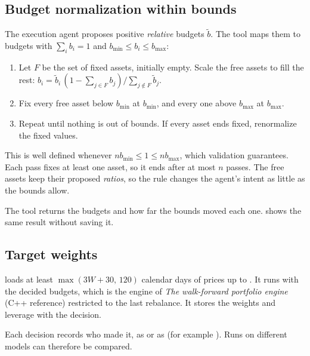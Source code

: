 \documentclass[11pt,a4paper]{article}
\makeatletter
\newcommand{\snippetsource}[1]{\csname snippet@#1\endcsname}
\newcommand{\snippet}[3]{%
  }
\newcommand{\xref}[2]{\emph{#2} (#1 reference)}
\makeatother
\begin{document}
\subsection{Budget normalization within bounds}
The execution agent proposes positive \emph{relative} budgets $\tilde b$. The tool
 maps them to budgets with $\sum_ib_i=1$ and
$b_{\min}\le b_i\le b_{\max}$:
\begin{enumerate}
  \item Let $F$ be the set of fixed assets, initially empty. Scale the free assets to fill
        the rest: $b_i=\tilde b_i\,(1-\sum_{j\in F}b_j)/\sum_{j\notin F}\tilde b_j$.
  \item Fix every free asset below $b_{\min}$ at $b_{\min}$, and every one above $b_{\max}$
        at $b_{\max}$.
  \item Repeat until nothing is out of bounds. If every asset ends fixed, renormalize the
        fixed values.
\end{enumerate}
This is well defined whenever $nb_{\min}\le1\le nb_{\max}$, which validation guarantees.
Each pass fixes at least one asset, so it ends after at most $n$ passes. The free assets
keep their proposed \emph{ratios}, so the rule changes the agent's intent as little as the
bounds allow.

The tool returns the budgets and how far the bounds moved each one. 
shows the same result without saving it.
\snippet{project_budgets}{Python}{Budget normalization}
\snippet{set_risk_budgets}{Python}{The decision tool}

\subsection{Target weights}
 loads at least
$\max(3W+30,\,120)$ calendar days of prices up to . It runs
 with the decided budgets, which is the engine of
\xref{C++}{The walk-forward portfolio engine} restricted to the last rebalance. It stores the weights and leverage
with the decision.

Each decision records who made it, as  or as
 (for example ). Runs on different
models can therefore be compared.
\snippet{compute_weights}{Python}{Budgets to target weights through the C++ engine}
\end{document}
